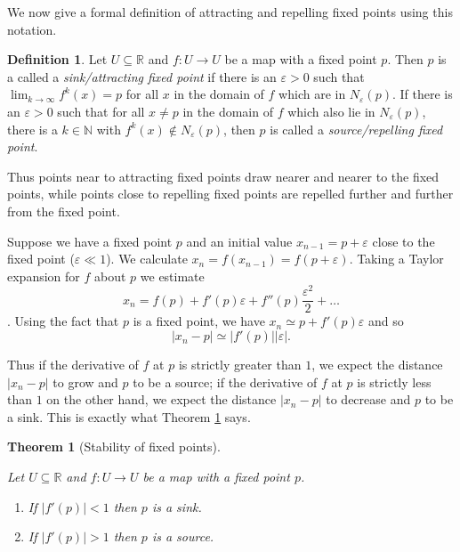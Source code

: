 \documentclass[
  a4paper,
  oneside,
  final]{krantz}
\providecommand{\tightlist}{%
  \setlength{\itemsep}{0pt}\setlength{\parskip}{0pt}}
\newcommand{\R}{\mathbb{R}}
\newcommand{\N}{\mathbb{N}}
\renewcommand{\epsilon}{\varepsilon}
\newtheorem{theorem}{Theorem}[chapter]
\theoremstyle{definition}
\newtheorem{definition}{Definition}[chapter]
\theoremstyle{definition}
\theoremstyle{definition}
\theoremstyle{definition}
\theoremstyle{remark}
\begin{document}
We now give a formal definition of attracting and repelling fixed points using this notation.

\begin{definition}
\protect\hypertarget{def:defstability}{}\label{def:defstability}Let \(U \subseteq \R\) and \(f: U \to U\) be a map with a fixed point \(p\). Then \(p\) is a called a \emph{sink/attracting fixed point} if there is an \(\epsilon > 0\) such that \(\lim_{k \to \infty} f^{k}(x) = p\) for all \(x\) in the domain of \(f\) which are in \(N_{\epsilon} (p)\). If there is an \(\epsilon> 0\) such that for all \(x \ne p\) in the domain of \(f\) which also lie in \(N_{\epsilon}(p)\), there is a \(k \in \N\) with \(f^{k}(x) \notin N_{\epsilon}(p)\), then
\(p\) is called a \emph{source/repelling fixed point}.
\end{definition}

Thus points near to attracting fixed points draw nearer and nearer to the fixed points, while points close to repelling fixed points are repelled further and further from the fixed point.

Suppose we have a fixed point \(p\) and an initial value \(x_{n-1} = p+ \epsilon\) close to the fixed point (\(\epsilon \ll 1\)). We calculate \(x_n = f(x_{n-1}) = f(p+ \epsilon)\). Taking a Taylor expansion for \(f\) about \(p\) we estimate \[ x_n = f(p) + f'(p) \epsilon +  f''(p) \frac{\epsilon^2}{2} + \ldots \]. Using the fact that \(p\) is a fixed point, we have \(x_n \simeq p + f'(p) \epsilon\) and so \[ |x_n - p| \simeq |f'(p)||\epsilon|.\]

Thus if the derivative of \(f\) at \(p\) is strictly greater than \(1\), we expect the distance \(|x_n-p|\) to grow and \(p\) to be a source; if the derivative of \(f\) at \(p\) is strictly less than \(1\) on the other hand, we expect the distance \(|x_n -p|\) to decrease and \(p\) to be a sink. This is exactly what Theorem \ref{thm:thmstability} says.

\begin{theorem}[Stability of fixed points]
\protect\hypertarget{thm:thmstability}{}\label{thm:thmstability}

Let \(U \subseteq \R\) and \(f: U \to U\) be a map with a fixed point \(p\).

\begin{enumerate}
\def\labelenumi{\arabic{enumi}.}
\tightlist
\item
  If \(|f'(p)| < 1\) then \(p\) is a sink.
\item
  If \(|f'(p)| > 1\) then \(p\) is a source.
\end{enumerate}

\end{theorem}
\end{document}
